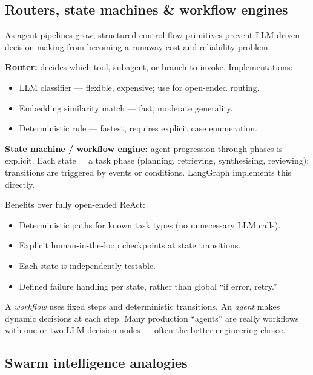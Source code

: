\subsection{Routers, state machines \& workflow engines}

As agent pipelines grow, structured control-flow primitives prevent LLM-driven
decision-making from becoming a runaway cost and reliability problem.

\textbf{Router:} decides which tool, subagent, or branch to invoke. Implementations:
\begin{itemize}
  \item LLM classifier --- flexible, expensive; use for open-ended routing.
  \item Embedding similarity match --- fast, moderate generality.
  \item Deterministic rule --- fastest, requires explicit case enumeration.
\end{itemize}

\textbf{State machine / workflow engine:} agent progression through phases is
explicit. Each state = a task phase (planning, retrieving, synthesising, reviewing);
transitions are triggered by events or conditions. LangGraph implements this directly.

Benefits over fully open-ended ReAct:
\begin{itemize}
  \item Deterministic paths for known task types (no unnecessary LLM calls).
  \item Explicit human-in-the-loop checkpoints at state transitions.
  \item Each state is independently testable.
  \item Defined failure handling per state, rather than global ``if error, retry.''
\end{itemize}

\begin{notebox}[title=Agent vs workflow]
  A \emph{workflow} uses fixed steps and deterministic transitions.
  An \emph{agent} makes dynamic decisions at each step.
  Many production ``agents'' are really workflows with one or two LLM-decision
  nodes --- often the better engineering choice.
\end{notebox}

\subsection{Swarm intelligence analogies}

